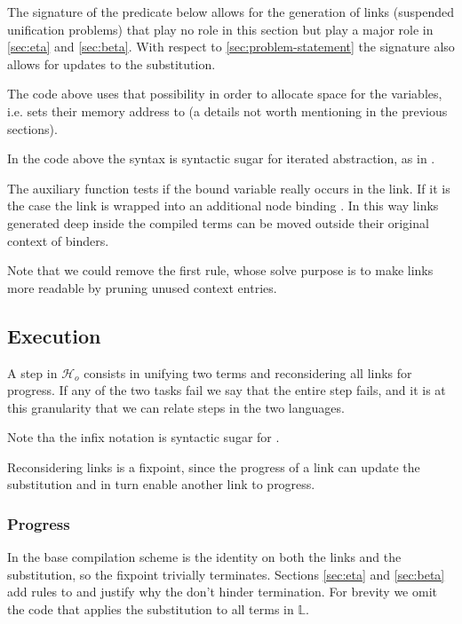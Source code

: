 \documentclass[sigconf,natbib=false,review]{acmart}
\newcommand{\UnifRel}{\ensuremath{\simeq}}
\newcommand{\Ue}{\ensuremath{\UnifRel_\lambda}\xspace}
\newcommand{\Ho}{\ensuremath{\mathcal{H}_o}\xspace}
\newcommand{\linkStore}{\ensuremath{\mathbb{L}}\xspace}
\begin{document}
The signature of the  predicate below allows for the generation of
links (suspended unification problems) that play no role in this section
but play a major role in \cref{sec:eta} and \cref{sec:beta}.
With respect to \cref{sec:problem-statement} the signature also allows
for updates to the substitution.



\noindent
The code above uses that possibility
in order to allocate space for the variables, i.e. sets their memory
address to  (a details not worth mentioning in the
previous sections).



\noindent
In the code above the syntax  is syntactic sugar for
iterated  abstraction, as in .

The auxiliary function  tests if the bound variable
 really occurs in the link. If it is the case the link is wrapped into
an additional  node binding . In this way links generated
deep inside the compiled terms can be moved outside their original context
of binders.



\noindent
Note that we could remove the first rule, whose solve purpose is to make
links more readable by pruning unused context entries.

\subsection{Execution}
\label{sec:execution}

A step in \Ho consists in unifying two terms and reconsidering all
links for progress. If any of the two tasks fail we say that the entire step
fails, and it is at this granularity that we can relate steps in the
two languages.




\noindent
Note tha the infix notation \elpiIn{((A ~\Ue~B) C D)} is syntactic sugar for
\elpiIn{((~\Ue\!\!\!~) A B C D)}.

Reconsidering links is a fixpoint, since the progress of a link can update the
substitution and in turn enable another link to progress.



\subsubsection{Progress}
In the base compilation scheme  is the identity
on both the links and the substitution, so the fixpoint trivially terminates.
Sections \ref{sec:eta} and \ref{sec:beta} add rules to 
and justify why the don't hinder termination. For brevity we omit the code
that applies the substitution  to all terms in \linkStore.
\end{document}
